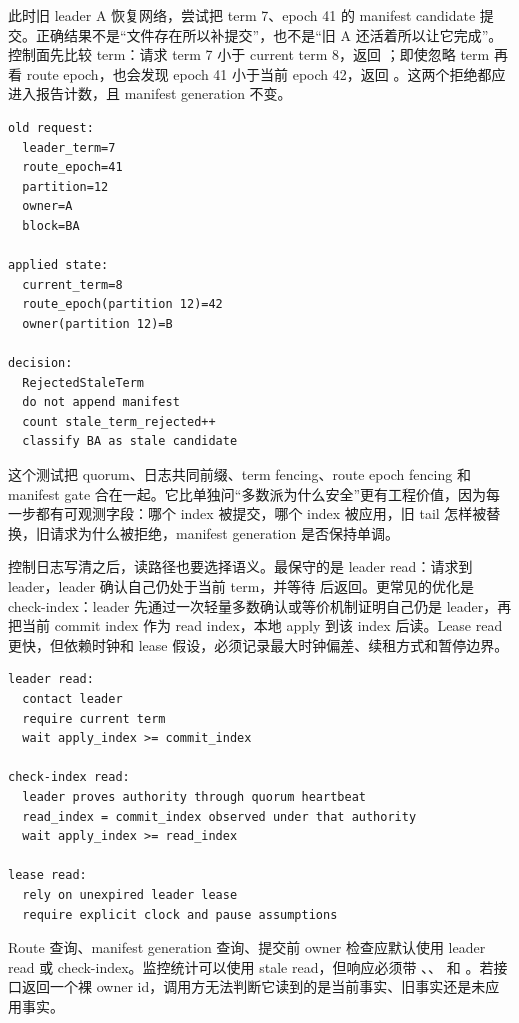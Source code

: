 此时旧 leader A 恢复网络，尝试把 term 7、epoch 41 的 manifest candidate 提交。正确结果不是“文件存在所以补提交”，也不是“旧 A 还活着所以让它完成”。控制面先比较 term：请求 term 7 小于 current term 8，返回 ；即使忽略 term 再看 route epoch，也会发现 epoch 41 小于当前 epoch 42，返回 。这两个拒绝都应进入报告计数，且 manifest generation 不变。

\begin{lstlisting}[numbers=none,caption={旧 leader 提交被结构化拒绝}]
old request:
  leader_term=7
  route_epoch=41
  partition=12
  owner=A
  block=BA

applied state:
  current_term=8
  route_epoch(partition 12)=42
  owner(partition 12)=B

decision:
  RejectedStaleTerm
  do not append manifest
  count stale_term_rejected++
  classify BA as stale candidate
\end{lstlisting}

这个测试把 quorum、日志共同前缀、term fencing、route epoch fencing 和 manifest gate 合在一起。它比单独问“多数派为什么安全”更有工程价值，因为每一步都有可观测字段：哪个 index 被提交，哪个 index 被应用，旧 tail 怎样被替换，旧请求为什么被拒绝，manifest generation 是否保持单调。

控制日志写清之后，读路径也要选择语义。最保守的是 leader read：请求到 leader，leader 确认自己仍处于当前 term，并等待  后返回。更常见的优化是 check-index：leader 先通过一次轻量多数确认或等价机制证明自己仍是 leader，再把当前 commit index 作为 read index，本地 apply 到该 index 后读。Lease read 更快，但依赖时钟和 lease 假设，必须记录最大时钟偏差、续租方式和暂停边界。

\begin{lstlisting}[numbers=none,caption={控制面读的三种边界}]
leader read:
  contact leader
  require current term
  wait apply_index >= commit_index

check-index read:
  leader proves authority through quorum heartbeat
  read_index = commit_index observed under that authority
  wait apply_index >= read_index

lease read:
  rely on unexpired leader lease
  require explicit clock and pause assumptions
\end{lstlisting}

Route 查询、manifest generation 查询、提交前 owner 检查应默认使用 leader read 或 check-index。监控统计可以使用 stale read，但响应必须带 、、 和 。若接口返回一个裸 owner id，调用方无法判断它读到的是当前事实、旧事实还是未应用事实。

